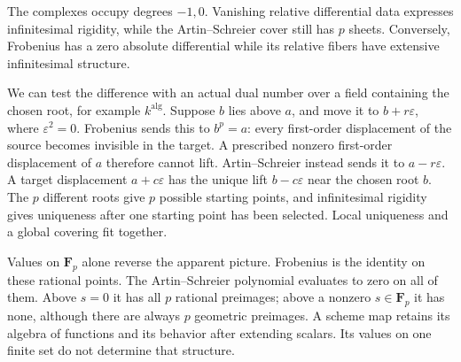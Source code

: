 \documentclass[11pt,letterpaper]{article}
\begin{document}
The complexes occupy degrees \(
-1,0
\). Vanishing relative differential data expresses infinitesimal rigidity, while the Artin–Schreier cover still has \(
p
\) sheets. Conversely, Frobenius has a zero absolute differential while its relative fibers have extensive infinitesimal structure.


We can test the difference with an actual dual number over a field containing the chosen root, for example \(
k^{\mathrm{alg}}
\). Suppose \(
b
\) lies above \(
a
\), and move it to \(
b+r\varepsilon
\), where \(
\varepsilon^2=0
\). Frobenius sends this to \(
b^p=a
\): every first-order displacement of the source becomes invisible in the target. A prescribed nonzero first-order displacement of \(
a
\) therefore cannot lift. Artin–Schreier instead sends it to \(
a-r\varepsilon
\). A target displacement \(
a+c\varepsilon
\) has the unique lift \(
b-c\varepsilon
\) near the chosen root \(
b
\). The \(
p
\) different roots give \(
p
\) possible starting points, and infinitesimal rigidity gives uniqueness after one starting point has been selected. Local uniqueness and a global covering fit together.


Values on \(
\mathbf F_p
\) alone reverse the apparent picture. Frobenius is the identity on these rational points. The Artin–Schreier polynomial evaluates to zero on all of them. Above \(
s=0
\) it has all \(
p
\) rational preimages; above a nonzero \(
s\in\mathbf F_p
\) it has none, although there are always \(
p
\) geometric preimages. A scheme map retains its algebra of functions and its behavior after extending scalars. Its values on one finite set do not determine that structure.
\end{document}

